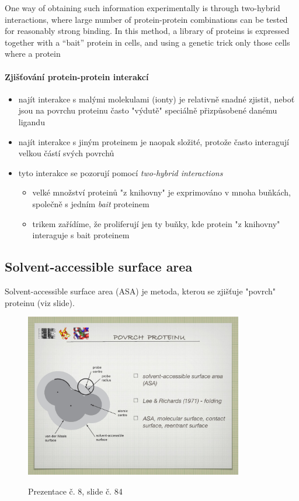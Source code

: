 \documentclass[DIV=8]{scrreprt}
\begin{document}
One way of obtaining such information experimentally is through two-hybrid interactions, where large number of protein-protein combinations can be tested for reasonably strong binding. In this method, a library of proteins is expressed together with a “bait” protein in cells, and using a genetic trick only those cells where a protein

\paragraph{Zjišťování protein-protein interakcí}
\begin{itemize}[nosep]
    \item najít interakce s malými molekulami (ionty) je relativně snadné zjistit, neboť jsou na povrchu proteinu často "výdutě" speciálně přizpůsobené danému ligandu
    \item najít interakce s jiným proteinem je naopak složité, protože často interagují velkou částí svých povrchů
    \item tyto interakce se pozorují pomocí \emph{two-hybrid interactions}
\begin{itemize}[nosep]
    \item velké množství proteinů "z knihovny" je exprimováno v mnoha buňkách, společně s jedním \emph{bait} proteinem
    \item trikem zařídíme, že proliferují jen ty buňky, kde protein "z knihovny" interaguje s bait proteinem
\end{itemize}

\end{itemize}



\subsection{Solvent-accessible surface area} \label{Solvent-accessible surface area}


Solvent-accessible surface area (ASA) je metoda, kterou se zjišťuje "povrch" proteinu (viz slide). \begin{figure}
    \caption{Prezentace č. 8, slide č. 84}
    \includegraphics[width=0.85\textwidth]{slides-8/slide-84.jpg}
    \centering
    \label{slides-8-slide-84}
\end{figure}
\end{document}
